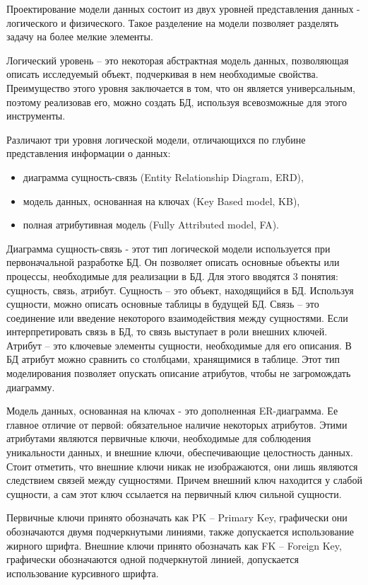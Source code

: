 Проектирование модели данных состоит из двух уровней представления данных - логического и физического. Такое разделение на модели позволяет разделять задачу на более мелкие элементы.

Логический уровень – это некоторая абстрактная модель данных, позволяющая описать исследуемый объект, подчеркивая в нем необходимые свойства. Преимущество этого уровня заключается в том, что он является универсальным, поэтому реализовав его, можно создать БД, используя всевозможные для этого инструменты.

Различают три уровня логической модели, отличающихся по глубине представления информации о данных:

\begin{itemize}
    \item диаграмма сущность-связь (Entity Relationship Diagram, ERD),
    \item модель данных, основанная на ключах (Key Based model, KB),
    \item полная атрибутивная модель (Fully Attributed model, FA).
\end{itemize}

Диаграмма сущность-связь - этот тип логической модели используется при первоначальной разработке БД. Он позволяет описать основные объекты или процессы, необходимые для реализации в БД. Для этого вводятся 3 понятия: сущность, связь, атрибут. Сущность – это объект, находящийся в БД. Используя сущности, можно описать основные таблицы в будущей БД. Связь – это соединение или введение некоторого взаимодействия между сущностями. Если интерпретировать связь в БД, то связь выступает в роли внешних ключей. Атрибут – это ключевые элементы сущности, необходимые для его описания. В БД атрибут можно сравнить со столбцами, хранящимися в таблице. Этот тип моделирования позволяет опускать описание атрибутов, чтобы не загромождать диаграмму.

Модель данных, основанная на ключах - это дополненная ER-диаграмма. Ее главное отличие от первой: обязательное наличие некоторых атрибутов. Этими атрибутами являются первичные ключи, необходимые для соблюдения уникальности данных, и внешние ключи, обеспечивающие целостность данных. Стоит отметить, что внешние ключи никак не изображаются, они лишь являются следствием связей между сущностями. Причем внешний ключ находится у слабой сущности, а сам этот ключ ссылается на первичный ключ сильной сущности.

Первичные ключи принято обозначать как PK – Primary Key, графически они обозначаются двумя подчеркнутыми линиями, также допускается использование жирного шрифта. Внешние ключи принято обозначать как FK – Foreign Key, графически обозначаются одной подчеркнутой линией, допускается использование курсивного шрифта.

